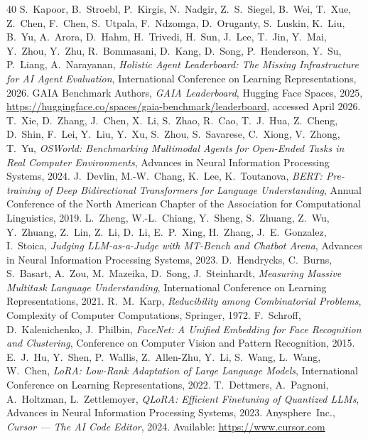 \documentclass[a4paper,11pt,twoside]{report}
\theoremstyle{definition}
\begin{document}
\begin{thebibliography}{40}
 S.~Kapoor, B.~Stroebl, P.~Kirgis, N.~Nadgir, Z.~S.~Siegel, B.~Wei, T.~Xue, Z.~Chen, F.~Chen, S.~Utpala, F.~Ndzomga, D.~Oruganty, S.~Luskin, K.~Liu, B.~Yu, A.~Arora, D.~Hahm, H.~Trivedi, H.~Sun, J.~Lee, T.~Jin, Y.~Mai, Y.~Zhou, Y.~Zhu, R.~Bommasani, D.~Kang, D.~Song, P.~Henderson, Y.~Su, P.~Liang, A.~Narayanan, \emph{Holistic Agent Leaderboard: The Missing Infrastructure for AI Agent Evaluation}, International Conference on Learning Representations, 2026.
 GAIA Benchmark Authors, \emph{GAIA Leaderboard}, Hugging Face Spaces, 2025, \url{https://huggingface.co/spaces/gaia-benchmark/leaderboard}, accessed April 2026.
 T.~Xie, D.~Zhang, J.~Chen, X.~Li, S.~Zhao, R.~Cao, T.~J.~Hua, Z.~Cheng, D.~Shin, F.~Lei, Y.~Liu, Y.~Xu, S.~Zhou, S.~Savarese, C.~Xiong, V.~Zhong, T.~Yu, \emph{OSWorld: Benchmarking Multimodal Agents for Open-Ended Tasks in Real Computer Environments}, Advances in Neural Information Processing Systems, 2024.
 J.~Devlin, M.-W.~Chang, K.~Lee, K.~Toutanova, \emph{BERT: Pre-training of Deep Bidirectional Transformers for Language Understanding}, Annual Conference of the North American Chapter of the Association for Computational Linguistics, 2019.
 L.~Zheng, W.-L.~Chiang, Y.~Sheng, S.~Zhuang, Z.~Wu, Y.~Zhuang, Z.~Lin, Z.~Li, D.~Li, E.~P.~Xing, H.~Zhang, J.~E.~Gonzalez, I.~Stoica, \emph{Judging LLM-as-a-Judge with MT-Bench and Chatbot Arena}, Advances in Neural Information Processing Systems, 2023.
 D.~Hendrycks, C.~Burns, S.~Basart, A.~Zou, M.~Mazeika, D.~Song, J.~Steinhardt, \emph{Measuring Massive Multitask Language Understanding}, International Conference on Learning Representations, 2021.
 R.~M.~Karp, \emph{Reducibility among Combinatorial Problems}, Complexity of Computer Computations, Springer, 1972.
 F.~Schroff, D.~Kalenichenko, J.~Philbin, \emph{FaceNet: A Unified Embedding for Face Recognition and Clustering}, Conference on Computer Vision and Pattern Recognition, 2015.
 E.~J.~Hu, Y.~Shen, P.~Wallis, Z.~Allen-Zhu, Y.~Li, S.~Wang, L.~Wang, W.~Chen, \emph{LoRA: Low-Rank Adaptation of Large Language Models}, International Conference on Learning Representations, 2022.
 T.~Dettmers, A.~Pagnoni, A.~Holtzman, L.~Zettlemoyer, \emph{QLoRA: Efficient Finetuning of Quantized LLMs}, Advances in Neural Information Processing Systems, 2023.
 Anysphere~Inc., \emph{Cursor --- The AI Code Editor}, 2024. Available: \url{https://www.cursor.com}

\end{thebibliography}
\end{document}
